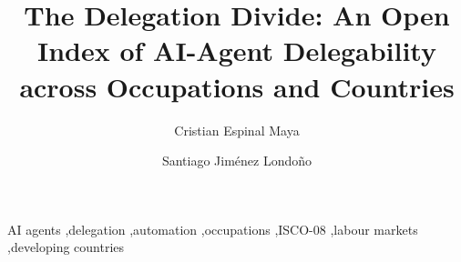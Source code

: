\documentclass[preprint,12pt,authoryear]{elsarticle}
\newif\ifanonimo
\begin{document}
\begin{frontmatter}
\title{The Delegation Divide: An Open Index of AI-Agent Delegability across Occupations and Countries}
\ifanonimo\else
\author[unal]{Cristian Espinal Maya}
\author[eafit]{Santiago Jim\'enez Londo\~no}
\fi
\begin{abstract}\end{abstract}

\begin{keyword}
AI agents \sep delegation \sep automation \sep occupations \sep ISCO-08 \sep labour markets \sep developing countries
\end{keyword}
\end{frontmatter}













\appendix


\ifanonimo\else\fi
\end{document}
